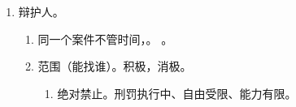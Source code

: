 \begin{enumerate}
\begin{enumerate}
\begin{enumerate}
\begin{enumerate}
                          \item {}。
                          \item {}。
                          \item {}。
                        \end{enumerate}
                  \item {}。
                        \begin{enumerate}
                          \item 提供法律咨询、程序选择建议。
                          \item 申请法律援助、变更强制措施。
                          \item 对案件处理提出意见。
                          \item 认罪认罚。对量刑建议提出意见；签署认罪认罚具结书时在场。
                        \end{enumerate}
                  \item 权利。。
                        \begin{enumerate}
                          \item {}。
                          \item {}。
                        \end{enumerate}
                  \item 无期死刑有经验（3 年），未成年人懂特点。新增。
                        。
                        。
                \end{enumerate}
        \end{enumerate}
  \item 辩护人。
        \begin{enumerate}
          \item 同一个案件不管时间，。
                。
          \item 范围（能找谁）。积极，消极。
                \begin{enumerate}
                  \item 绝对禁止。刑罚执行中、自由受限、能力有限。

\end{enumerate}
\end{enumerate}
\end{enumerate}
